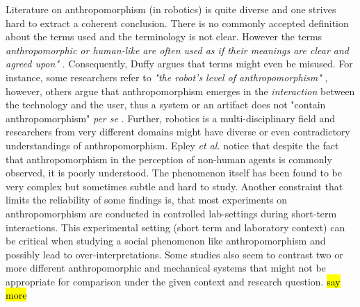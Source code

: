 \documentclass[twocolumn]{svjour3}          %
\begin{document}
	Literature on anthropomorphism (in robotics) is quite diverse and one strives hard to extract a coherent conclusion. There is no commonly accepted definition about the terms used and the terminology is not clear. However the terms \textit{anthropomorphic or human-like are often used as if their meanings are clear and agreed upon"} \cite{persson_anthropomorphism_2000}. Consequently, Duffy \cite{duffy_anthropomorphism_2002} argues that terms might even be misused. For instance, some researchers refer to \textit{"the robot's level of anthropomorphism"} \cite{bartneck_is_2007}, however, others argue that anthropomorphism emerges in the \textit{interaction} between the technology and the user, thus a system or an artifact does not "contain anthropomorphism" \textit{per se} \cite{persson_anthropomorphism_2000}. Further, robotics is a multi-disciplinary field and researchers from very different domains might have diverse or even contradictory understandings of anthropomorphism. Epley \textit{et al.} \cite{epley_seeing_2007} notice that despite the fact that anthropomorphism in the perception of non-human agents is commonly observed, it is poorly understood. The phenomenon itself has been found to be very complex but sometimes subtle and hard to study. Another constraint that limits the reliability of some findings is, that most experiments on anthropomorphism are conducted in controlled lab-settings during short-term interactions. This experimental setting (short term and laboratory context) can be critical when studying a social phenomenon like anthropomorphism and possibly lead to over-interpretations. Some studies also seem to contrast two or more different anthropomorphic and mechanical systems that might not be appropriate for comparison under the given context and research question. \hl{say more}
	
\end{document}
